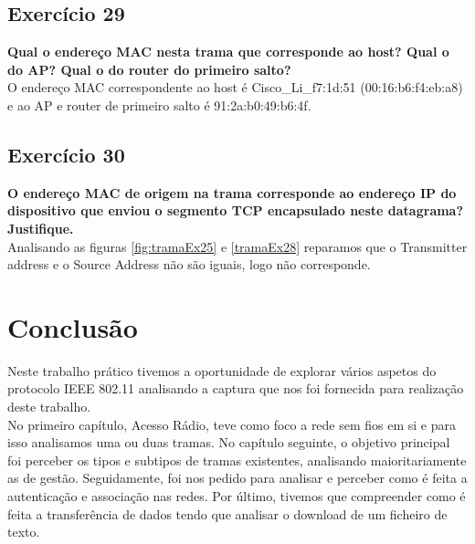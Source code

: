 \documentclass[a4paper]{report}
\begin{document}
\section{Exercício 29}
\textbf{Qual o endereço MAC nesta trama que corresponde ao host? Qual o do AP?
Qual o do router do primeiro salto?}\\
O endereço MAC correspondente ao host é Cisco\_Li\_f7:1d:51 (00:16:b6:f4:eb:a8)
e ao AP e router de primeiro salto é 91:2a:b0:49:b6:4f.

\section{Exercício 30}
\textbf{O endereço MAC de origem na trama corresponde ao endereço IP do
dispositivo que enviou o segmento TCP encapsulado neste datagrama?
Justifique.}\\
Analisando as figuras \ref{fig:tramaEx25} e \ref{tramaEx28} reparamos que o
Transmitter address e o Source Address não são iguais, logo não
corresponde.


\chapter{Conclusão}
Neste trabalho prático tivemos a oportunidade de explorar vários aspetos do
protocolo IEEE 802.11 analisando a captura que nos foi fornecida para realização
deste trabalho.\\
No primeiro capítulo, Acesso Rádio, teve como foco a rede sem fios em si e para
isso analisamos uma ou duas tramas. No capítulo seguinte, o objetivo principal
foi perceber os tipos e subtipos de tramas existentes, analisando
maioritariamente as de gestão. Seguidamente, foi nos pedido para analisar e
perceber como é feita a autenticação e associação nas redes. Por último, tivemos
que compreender como é feita a transferência de dados tendo que analisar o
download de um ficheiro de texto.
\end{document}
